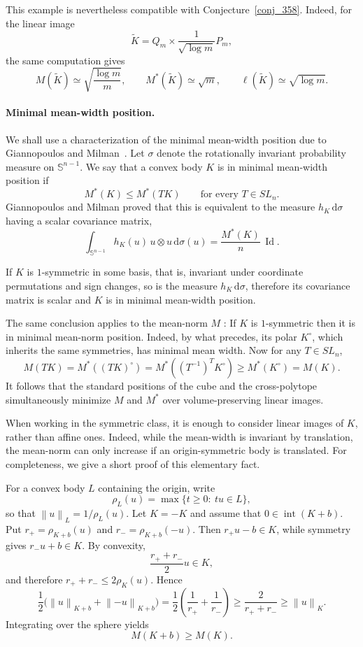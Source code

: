 \documentclass[12pt]{article}
\theoremstyle{definition}
\theoremstyle{remark}
\newcommand{\Id}{\operatorname{Id}}
\newcommand{\dd}{\,\mathrm d}
\newcommand{\norm}[1]{\left\lVert #1\right\rVert}
\begin{document}
This example is nevertheless compatible with
Conjecture~\ref{conj_358}. Indeed, for the linear image
\[
  \widetilde K
  =Q_m\times\frac1{\sqrt{\log m}}P_m,
\]
the same computation gives
\[
  M(\widetilde K)\simeq\sqrt{\frac{\log m}{m}},
  \qquad
  M^*(\widetilde K)\simeq\sqrt m,
  \qquad
  \ell(\widetilde K)\simeq\sqrt{\log m}.
\]

\paragraph{Minimal mean-width position.}
We shall use a characterization of the minimal mean-width position due to Giannopoulos and Milman~\cite{GiannopoulosMilman}.
Let $\sigma$ denote the rotationally invariant probability measure on
$\mathbb S^{n-1}$. We say that a convex body $K$ is in minimal mean-width position if
\[
  M^*(K)\leq M^*(TK)
  \qquad\text{for every }T\in SL_n.
\]
Giannopoulos and Milman proved that this is equivalent to the measure $h_K\dd\sigma$ having a scalar covariance matrix,
\begin{equation}\label{eq_1135}
  \int_{\mathbb S^{n-1}}h_K(u)\,u\otimes u\dd\sigma(u)
  =\frac{M^*(K)}{n}\,\Id.
\end{equation}

If $K$ is $1$-symmetric in some basis, that is, invariant under coordinate permutations and sign changes, so is the measure $h_K\dd\sigma$, therefore its covariance matrix is scalar and $K$ is in minimal mean-width position.

The same conclusion applies to the mean-norm $M$ : If $K$ is $1$-symmetric then it is in minimal mean-norm position. Indeed, by what precedes, its polar $K^\circ$, which inherits the same symmetries, has minimal mean width. Now for any $T\in SL_n$,
\[
  M(TK)=M^*((TK)^\circ)
  =M^*((T^{-1})^TK^\circ)
  \geq M^*(K^\circ)=M(K).
\]
It follows that the standard positions of the cube and the cross-polytope
simultaneously minimize $M$ and $M^*$ over volume-preserving linear images.

When working in the symmetric class, it is enough to consider linear images of $K$, rather than affine ones. Indeed, while the mean-width is invariant by translation, the mean-norm can only increase if an origin-symmetric body is translated. For completeness, we give a short proof of this elementary fact.

For a convex body $L$ containing the origin, write
\[
  \rho_L(u)=\max\{t\geq0:\ tu\in L\},
\]
so that $\norm{u}_L=1/\rho_L(u)$. Let $K=-K$ and assume that
$0\in\operatorname{int}(K+b)$. Put
$r_+=\rho_{K+b}(u)$ and $r_-=\rho_{K+b}(-u)$. Then
$r_+u-b\in K$, while symmetry gives $r_-u+b\in K$. By convexity,
\[
  \frac{r_++r_-}{2}u\in K,
\]
and therefore $r_++r_-\leq2\rho_K(u)$. Hence
\[
  \frac12\bigl(\norm{u}_{K+b}+\norm{-u}_{K+b}\bigr)
  =\frac12\left(\frac1{r_+}+\frac1{r_-}\right)
  \geq\frac2{r_++r_-}
  \geq\norm{u}_K.
\]
Integrating over the sphere yields
\begin{equation}\label{eq_1172}
  M(K+b)\geq M(K).
\end{equation}
\end{document}

